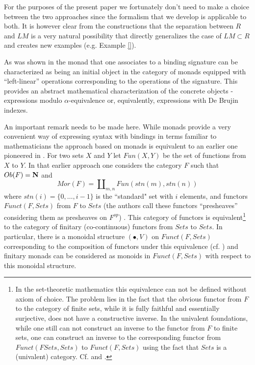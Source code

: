 \documentclass[11pt]{article}
\newcommand{\nn}{{\bf N\rm}}
\begin{document}
For the purposes of the present paper we fortunately don't need to make a choice between the two approaches since the formalism that we develop is applicable to both. It is however clear from the constructions that the separation between $R$ and $LM$ is a very natural possibility that directly generalizes the case of $LM\subset R$ and creates new examples (e.g. Example \ref{}). 

As was shown in \cite{HM2007} the monad that one associates to a binding signature can be characterized as being an initial object in the category of monads equipped with ``left-linear'' operations corresponding to the operations of the signature.  This provides an abstract mathematical characterization of the concrete objects - expressions modulo $\alpha$-equivalence or, equivalently, expressions with De Brujin indexes. 

An important remark needs to be made here. While monads provide a very convenient way of expressing syntax with bindings in terms familiar to mathematicians the approach based on monads is equivalent to an earlier one pioneered in \cite{FPT}. For two sets $X$ and $Y$ let $Fun(X,Y)$ be the set of functions from $X$ to $Y$.  In that earlier approach one considers the category $F$ such that $Ob(F)=\nn$ and
%
$$Mor(F)=\amalg_{m,n}Fun(stn(m),stn(n))$$
%
where $stn(i)=\{0,\dots,i-1\}$ is the ``standard" set with $i$ elements, and functors $Funct(F,Sets)$ from $F$ to $Sets$ (the authors call these functors ``presheaves'' considering them as presheaves on $F^{op}$) . This category of functors is equivalent\footnote{In the set-theoretic mathematics this equivalence can not be defined without axiom of choice. The problem lies in the fact that the obvious functor from $F$ to the category of finite sets, while it is  fully faithful and essentially surjective, does not have a constructive inverse. In the univalent foundations, while one still can not construct an inverse to the functor from $F$ to finite sets, one can construct an inverse to the corresponding functor from $Funct(FSets,Sets)$ to $Funct(F,Sets)$ using the fact that $Sets$ is a (univalent) category. Cf. \cite{RezkCompletion} and \cite[RezkCompletion library]{UniMath}.} to the category of finitary (co-continuous) functors from $Sets$ to $Sets$. In particular, there is a monoidal structure $(\bullet,V)$ on $Funct(F,Sets)$ corresponding to the composition of functors under this equivalence (cf. \cite[Sec. 3]{FPT}) and finitary monads can be considered as monoids in $Funct(F,Sets)$ with respect to this monoidal structure. 
\end{document}
